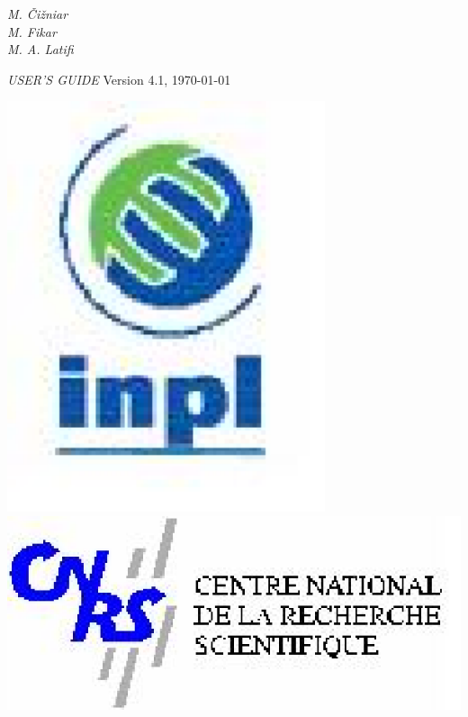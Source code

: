 \begin{minipage}[t]{1\linewidth}
\begin{minipage}[t]{0.78\linewidth}
\begin{minipage}[t]{0.82\linewidth}
\begin{flushleft}
{{{          }
        }}
      \end{flushleft}
    \end{minipage}
    \vspace{2cm}
    \begin{flushright}
      \dynopttitle
      \vspace{1cm}
      {\large{\emph{
        M. \v{C}i\v{z}niar~~~~~\\
        M. Fikar~~~~~\\
        M. A. Latifi~~~~~\\
      }}}
    \end{flushright}
    \vspace{13cm}
    {\LARGE{\emph{USER'S GUIDE}}} 
    \hfill {\large{Version 4.1, \today}}
  \end{minipage}
  \begin{minipage}[t]{0.2\linewidth}
    \vspace{0.1cm}
    \begin{center}
      \includegraphics[width=0.7\textwidth]{pictures/logoinpl}
      \vspace{0.5cm}
      \includegraphics[width=1\textwidth]{pictures/logocnrs}

\end{center}
\end{minipage}
\end{minipage}
